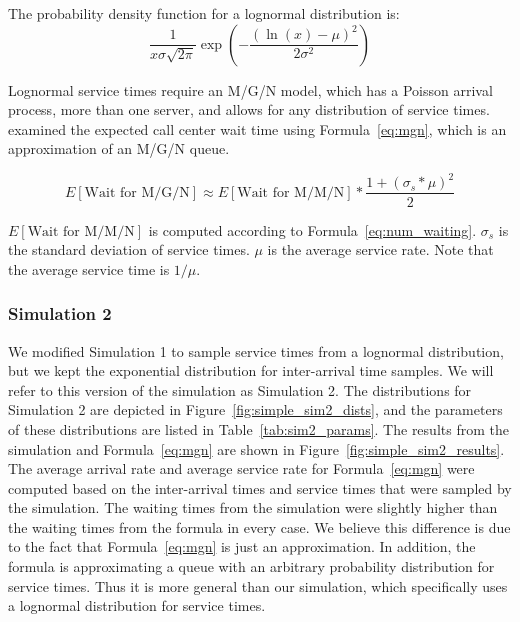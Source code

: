 The probability density function for a lognormal distribution is:
\[
  \frac{1}{x \sigma \sqrt{2 \pi}}
  \exp{\left( - \frac{\left( \ln(x) - \mu \right)^2}{2 \sigma^2} \right)}
\]

Lognormal service times require an M/G/N model, which has a Poisson arrival
process, more than one server, and allows for any distribution of service times.
\citet{queue1} examined the expected call center wait time using
Formula~\ref{eq:mgn}, which is an approximation of an M/G/N queue.

\begin{equation}
  E[\text{Wait for M/G/N}] \approx E[\text{Wait for M/M/N}] *
  \frac{1 + (\sigma_s * \mu)^2}{2}
\label{eq:mgn}
\end{equation}

$E[\text{Wait for M/M/N}]$ is computed according to
Formula~\ref{eq:num_waiting}.
$\sigma_s$ is the standard deviation of service times.
$\mu$ is the average service rate.
Note that the average service time is $1/\mu$.

\subsubsection{Simulation 2}

We modified Simulation 1 to sample service times from a lognormal
distribution, but we kept the exponential distribution for inter-arrival time
samples.
We will refer to this version of the simulation as Simulation 2.
The distributions for Simulation 2 are depicted in
Figure~\ref{fig:simple_sim2_dists}, and the parameters of these distributions
are listed in Table~\ref{tab:sim2_params}.
The results from the simulation and Formula~\ref{eq:mgn} are shown in
Figure~\ref{fig:simple_sim2_results}.
The average arrival rate and average service rate for Formula~\ref{eq:mgn} were
computed based on the inter-arrival times and service times that were sampled by
the simulation.
The waiting times from the simulation were slightly higher than the waiting
times from the formula in every case.
We believe this difference is due to the fact that Formula~\ref{eq:mgn} is just
an approximation.
In addition, the formula is approximating a queue with an arbitrary probability
distribution for service times.
Thus it is more general than our simulation, which specifically uses a lognormal
distribution for service times.

